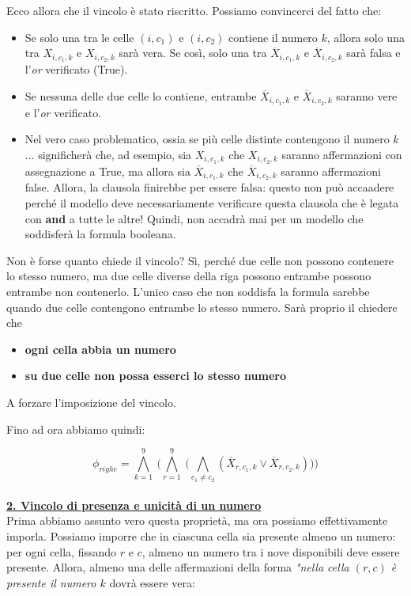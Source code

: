 \documentclass[a4paper,10pt]{article}
\begin{document}
{\begin{itemize}[label=, leftmargin=0pt]
\begin{osservazioni}
    Ecco allora che il vincolo è stato riscritto. Possiamo convincerci del fatto che:
    \begin{itemize}
        \item Se solo una tra le celle $(i,c_1)$ e $(i,c_2)$ contiene il numero $k$, allora solo una tra $X_{i,c_1,k}$ e $X_{i,c_2,k}$ sarà vera. Se così, solo una tra $\overline X_{i,c_1,k}$ e $\overline X_{i,c_2,k}$ sarà falsa e l'\textit{or} verificato (True).
        \item Se nessuna delle due celle lo contiene, entrambe $\overline X_{i,c_1,k}$ e $\overline X_{i,c_2,k}$ saranno vere e l'\textit{or} verificato.
        \item Nel vero caso problematico, ossia se più celle distinte contengono il numero $k$... significherà che, ad esempio, sia $X_{i,c_1,k}$ che $X_{i,c_2,k}$ saranno affermazioni con assegnazione a True, ma allora sia $\overline X_{i,c_1,k}$ che $\overline X_{i,c_2,k}$ saranno affermazioni false. Allora, la clausola finirebbe per essere falsa: questo non può accaadere perché il modello deve necessariamente verificare questa clausola che è legata con \textbf{and} a tutte le altre! Quindi, non accadrà mai per un modello che soddisferà la formula booleana.
    \end{itemize}

    Non è forse quanto chiede il vincolo? Sì, perché due celle non possono contenere lo stesso numero, ma due celle diverse della riga possono entrambe possono entrambe non contenerlo. L'unico caso che non soddisfa la formula sarebbe quando due celle contengono entrambe lo stesso numero.
    Sarà proprio il chiedere che 
    \begin{itemize}
        \item \textbf{ogni cella abbia un numero}
        \item \textbf{su due celle non possa esserci lo stesso numero}
    \end{itemize}
    A forzare l'imposizione del vincolo.

    Fino ad ora abbiamo quindi:

    $$\phi_{righe}= \bigwedge\limits_{k=1}^{9}\ \bigg(\bigwedge\limits_{r=1}^{9}\ \bigg( 
    \bigwedge\limits_{c_1\ne c_2} (\overline X_{r,c_1,k} \lor \overline X_{r,c_2,k})
    \bigg)\bigg)$$\\
    

\underline{\textbf{2. Vincolo di presenza e unicità di un numero}}\\
Prima abbiamo assunto vero questa proprietà, ma ora possiamo effettivamente imporla. Possiamo imporre che in ciascuna cella sia presente almeno un numero: per ogni cella, fissando $r$ e $c$, almeno un numero tra i nove disponibili deve essere presente. Allora, almeno una delle affermazioni della forma \textit{"nella cella $(r,c)$ è presente il numero $k$} dovrà essere vera:


\end{osservazioni}
\end{itemize}}
\end{document}
